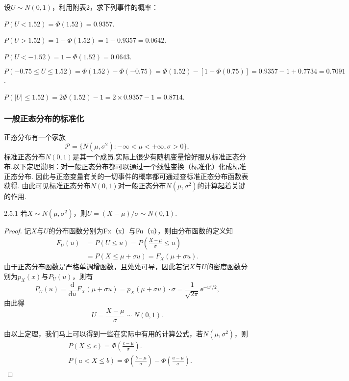 \begin{example}
  设$U\sim N(0,1)$，利用附表2，求下列事件的概率：

  \begin{inparaenum}[(1)]
    \item $P(U<1.52)=\varPhi(1.52)=0.9357$.

    \item $P(U>1.52)=1-\varPhi(1.52)=1-0.9357=0.0642$.

    \item $P(U<-1.52)=1-\varPhi(1.52)=0.0643$.

    \item $P(-0.75\le U\le1.52)=\varPhi(1.52)-\varPhi(-0.75)
        =\varPhi(1.52)-[1-\varPhi(0.75)]=0.9357-1+
        0.7734=0.7091$.

    \item $P(|U|\le1.52)=2\varPhi(1.52)-1=2\times0.9357-1
        =0.8714$.
  \end{inparaenum}
\end{example}

\subsubsection{一般正态分布的标准化}
正态分布有一个家族
\[
  \mathscr P = \{ N(\mu,\sigma^2):-\infty<\mu<+\infty,\sigma>0 \},
\]
标准正态分布$N(0,1)$是其一个成员.实际上很少有随机变量恰好服从标准正态分布.以下定理说明：对一般正态分布都可以通过一个线性变换（标准化）化成标准正态分布. 因此与正态变量有关的一切事件的概率都可通过查标准正态分布函数表获得. 由此可见标准正态分布$N(0,1)$对一般正态分布$N(\mu,\sigma^2)$的计算起着关键的作用.

\begin{theorem}{}{2.5.1}
  若$X\sim N(\mu,\sigma^2)$，则$U=(X-\mu)/\sigma\sim N(0,1)$.
\end{theorem}
\begin{proof}
  记$X$与$U$的分布函数分别为Fx（x）与Fu（u），则由分布函数的定义知
  \begin{align*}
    F_U(u) & = P(U \le u) = P \left( \frac{X - \mu}\sigma \le u \right) \\
    & = P(X \le \mu + \sigma u) = F_X(\mu + \sigma u).
  \end{align*}
  由于正态分布函数是严格单调增函数，且处处可导，因此若记$X$与$U$的密度函数分别为$p_X(x)$与$P_U(u)$，则有
  \[
    P_U(u) = \frac{\mathrm d}{\mathrm du}F_X(\mu + \sigma u) = p_X(\mu+\sigma u)\cdot \sigma = \frac1{\sqrt{2\pi}} \ee^{-u^2/2},
  \]
  由此得
  \[
    U = \frac{X-\mu}\sigma \sim N(0,1).
  \]

  由以上定理，我们马上可以得到一些在实际中有用的计算公式，若$N(\mu,\sigma^2)$，则
  \begin{align}
    & P(X \le c) = \varPhi\left( \frac{c-\mu}\sigma \right) . \label{eq2.5.3}\\
    & P(a < X\le b) = \varPhi\left( \frac{b-\mu}\sigma \right) - \varPhi\left( \frac{a-\mu}\sigma \right).\label{eq2.5.4}
  \end{align}
\end{proof}

